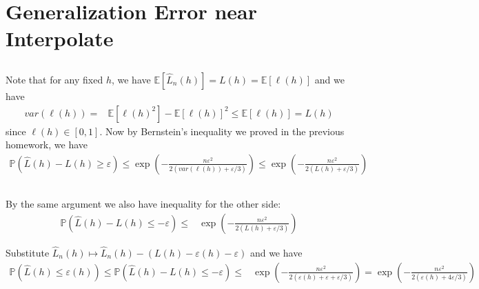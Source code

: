 \documentclass[11pt,a4paper]{ctexart}
\numberwithin{equation}{section}%
\begin{document}
\section{Generalization Error near Interpolate}

\subsection{}

Note that for any fixed $ h $, we have $ \mathbb{E}\left[ \hat{L}_n(h) \right] = L(h) = \mathbb{E}\left[ \ell(h) \right]   $ and we have
\begin{align*}
    var(\ell(h)) =& \mathbb{E}\left[ \ell(h)^2 \right] - \mathbb{E}\left[ \ell(h) \right]^2 \leq \mathbb{E}\left[ \ell(h) \right] = L(h)
\end{align*}
since $ \ell(h) \in [0,1] $. Now by Bernstein's inequality we proved in the previous homework, we have
\begin{align*}
    \mathbb{P}\left( \hat{L}(h)-L(h) \geq \varepsilon  \right) \leq \exp\left( -\frac{n\varepsilon^2}{2( var(\ell(h)) + \varepsilon /3 )} \right) \leq  \exp\left( -\frac{n\varepsilon^2}{2( L(h) + \varepsilon /3 )} \right)
\end{align*}


\subsection{}

By the same argument we also have inequality for the other side:
\begin{align*}
    \mathbb{P}\left( \hat{L}(h)-L(h) \leq -\varepsilon  \right) \leq & \exp\left( -\frac{n\varepsilon^2}{2( L(h) + \varepsilon /3 )} \right) 
\end{align*}

Substitute $ \hat{L}_n(h)\mapsto \hat{L}_n(h) - (L(h) - \varepsilon (h)-\varepsilon ) $ and we have
\begin{align*}
    \mathbb{P}\left( \hat{L}(h) \leq \varepsilon(h)   \right) \leq \mathbb{P}\left( \hat{L}(h)-L(h) \leq -\varepsilon   \right) \leq & \exp\left( -\frac{n\varepsilon^2}{2( \varepsilon (h)+\varepsilon + \varepsilon /3 )} \right) = \exp\left( -\frac{n\varepsilon^2}{2( \varepsilon (h)+4\varepsilon /3 )} \right) 
\end{align*}

\subsection{}
\end{document}
